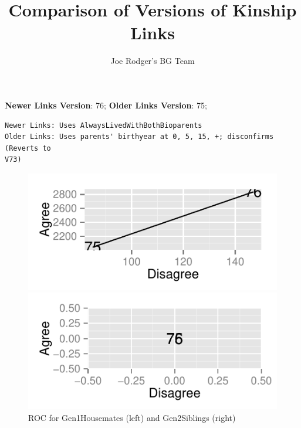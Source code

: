 \documentclass[a4paper]{article}\usepackage[]{graphicx}\usepackage[]{color}
\title{Comparison of Versions of Kinship Links}
\author{Joe Rodger's BG Team}
\makeatletter
\def\maxwidth{ %
  \ifdim\Gin@nat@width>\linewidth
    \linewidth
  \else
    \Gin@nat@width
  \fi
}
\newenvironment{kframe}{%
 \def\at@end@of@kframe{}%
 \ifinner\ifhmode%
  \def\at@end@of@kframe{\end{minipage}}%
  \begin{minipage}{\columnwidth}%
 \fi\fi%
 \def\FrameCommand##1{\hskip\@totalleftmargin \hskip-\fboxsep
 \colorbox{shadecolor}{##1}\hskip-\fboxsep
     \hskip-\linewidth \hskip-\@totalleftmargin \hskip\columnwidth}%
 \MakeFramed {\advance\hsize-\width
   \@totalleftmargin\z@ \linewidth\hsize
   \@setminipage}}%
 {\par\unskip\endMakeFramed%
 \at@end@of@kframe}
\newenvironment{knitrout}{}{} %
\makeatother
\begin{document}
\maketitle

\setlength{\parindent}{0pt}%







\textbf{Newer Links Version}: 76;
\textbf{Older Links Version}: 75;

\begin{knitrout}
\color{fgcolor}\begin{kframe}
\begin{verbatim}
Newer Links: Uses AlwaysLivedWithBothBioparents
Older Links: Uses parents' birthyear at 0, 5, 15, +; disconfirms (Reverts to
V73)
\end{verbatim}
\end{kframe}
\end{knitrout}


\begin{figure}[htbp]
\begin{knitrout}
\color{fgcolor}
\includegraphics[width=\maxwidth]{figure/unnamed-chunk-31} 

\includegraphics[width=\maxwidth]{figure/unnamed-chunk-32} 

\end{knitrout}

\caption{ROC for Gen1Housemates (left) and Gen2Siblings (right)}
\end{figure}
\end{document}
